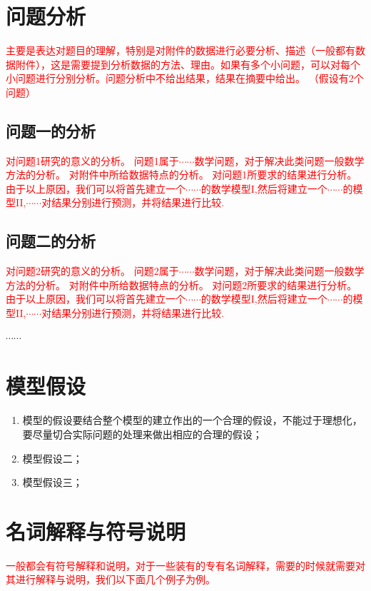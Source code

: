 \documentclass[a4paper]{nmmcm}
\begin{document}
\section{问题分析}

\textcolor{red}{主要是表达对题目的理解，特别是对附件的数据进行必要分析、描述（一般都有数据附件），这是需要提到分析数据的方法、理由。如果有多个小问题，可以对每个小问题进行分别分析。问题分析中不给出结果，结果在摘要中给出。
（假设有2个问题）}

\subsection{问题一的分析}

 \textcolor{red}{对问题1研究的意义的分析。
问题1属于$\cdots\cdots$数学问题，对于解决此类问题一般数学方法的分析。
对附件中所给数据特点的分析。
对问题1所要求的结果进行分析。
由于以上原因，我们可以将首先建立一个$\cdots\cdots$的数学模型I,然后将建立一个$\cdots\cdots$的模型II,$\cdots\cdots$对结果分别进行预测，并将结果进行比较.
}


\subsection{问题二的分析}
 \textcolor{red}{对问题2研究的意义的分析。
问题2属于$\cdots\cdots$数学问题，对于解决此类问题一般数学方法的分析。
对附件中所给数据特点的分析。
对问题2所要求的结果进行分析。
由于以上原因，我们可以将首先建立一个$\cdots\cdots$的数学模型I,然后将建立一个$\cdots\cdots$的模型II,$\cdots\cdots$对结果分别进行预测，并将结果进行比较.
}

 $\cdots\cdots$


\section{模型假设}
\begin{enumerate}
  \item 模型的假设要结合整个模型的建立作出的一个合理的假设，不能过于理想化，要尽量切合实际问题的处理来做出相应的合理的假设；
  \item 模型假设二；
  \item 模型假设三；
\end{enumerate}



\section{名词解释与符号说明}

\textcolor{red}{一般都会有符号解释和说明，对于一些装有的专有名词解释，需要的时候就需要对其进行解释与说明，我们以下面几个例子为例。}
\end{document}
